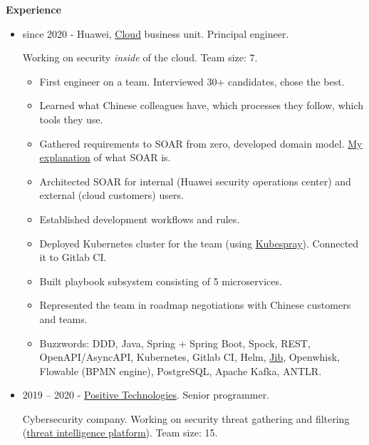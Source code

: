 \documentclass[final]{letter}
\begin{document}
{\bf Experience}
\begin{itemize}
  \item since 2020 - Huawei, \href{https://www.huaweicloud.com/en-us/}{Cloud} business unit. Principal engineer.

  Working on security \textit{inside} of the cloud. Team size: 7.

  \begin{itemize}
    \item First engineer on a team. Interviewed 30+ candidates, chose the best.
    \item Learned what Chinese colleagues have, which processes they follow, which tools they use.
    \item Gathered requirements to SOAR from zero, developed domain model. \href{https://neexee.github.io/posts-en/what-is-soar/}{My explanation} of what SOAR is.
    \item Architected SOAR for internal (Huawei security operations center) and external (cloud customers) users.
    \item Established development workflows and rules.
    \item Deployed Kubernetes cluster for the team (using \href{https://kubespray.io/}{Kubespray}). Connected it to Gitlab CI.
    \item Built playbook subsystem consisting of 5 microservices.
    \item Represented the team in roadmap negotiations with Chinese customers and teams.
    \item Buzzwords: DDD, Java, Spring + Spring Boot, Spock, REST, OpenAPI/AsyncAPI, Kubernetes, Gitlab CI, Helm, \href{https://github.com/GoogleContainerTools/jib}{Jib}, Openwhisk, Flowable (BPMN engine), PostgreSQL, Apache Kafka, ANTLR.
  \end{itemize}

  \item 2019 -- 2020 - \href{https://www.ptsecurity.com/ww-en/}{Positive Technologies}. Senior programmer.

  Cybersecurity company. Working on security threat gathering and filtering (\href{https://www.ptsecurity.com/ru-ru/products/cybersecurity-intelligence/}{threat intelligence platform}). Team size: 15.


\end{itemize}
\end{document}
